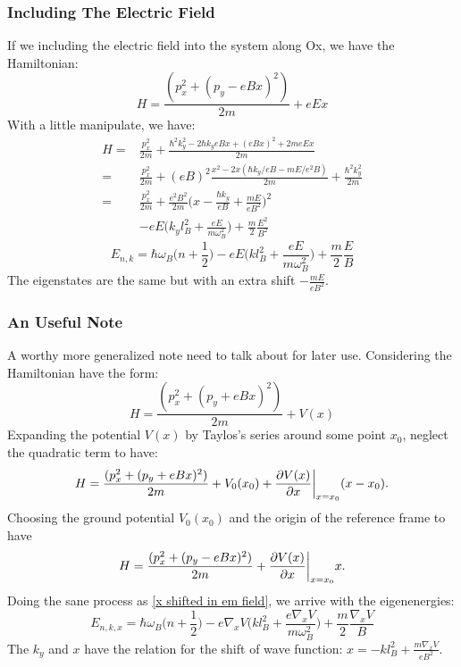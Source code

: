 \documentclass[unnumsec,webpdf,modern,large]{mam-authoring-template}%
\theoremstyle{thmstyleone}%
\theoremstyle{thmstyletwo}%
\theoremstyle{thmstylethree}%
\begin{document}
\begin{appendices}
\subsubsection{Including The Electric Field}
\quad If we including the electric field into the system along Ox, we have the Hamiltonian:
\begin{equation}
	H = \frac{(p_x^2 + (p_y-eBx)^2)}{2m} + eEx
\end{equation}
With a little manipulate, we have:
\begin{align}
	H =& \frac{p_x^2}{2m} + \frac{\hbar^2 k_y^2 - 2\hbar k_y eB x + (eBx)^2 + 2meEx}{2m}\nonumber\\
	=& \frac{p_x^2}{2m} + (eB)^2\frac{x^2 -2x(\hbar k_y /eB - mE/e^2B)}{2m} + \frac{\hbar^2 k_y^2}{2m}\nonumber\\
	\label{x shifted in em field}
	=& \frac{p_x^2}{2m} + \frac{e^2 B^2}{2m}\bigg(x- \frac{\hbar k_y}{eB} + \frac{mE}{eB^2}\bigg)^2\nonumber\\ &-eE\bigg(k_y l_B^2 + \frac{eE}{m \omega^2_B}\bigg) + \frac{m}{2}\frac{E^2}{B^2}
\end{align}
\begin{equation}\label{eigen energies in emf}
	E_{n,k}= \hbar \omega_B \bigg(n+\frac{1}{2}\bigg) - eE\bigg(kl_B^2 + \frac{eE}{m\omega_B^2}\bigg) + \frac{m}{2}\frac{E}{B}
\end{equation}
The eigenstates are the same but with an extra shift \(-\frac{mE}{e B^2}\).
\subsubsection{An Useful Note}
\quad A worthy more generalized note need to talk about for later use. Considering the Hamiltonian have the form:
\begin{equation*}
H = \frac{(p_x^2 + (p_y+eBx)^2)}{2m} + V(x)
\end{equation*}
\quad Expanding the potential \(V(x)\) by Taylos's series around some point \(x_0\), neglect the quadratic term to have:
\begin{equation*}
	H = \frac{(p_x^2 + (p_y+eBx)^2)}{2m} + V_0(x_0) + \pdv{V(x)}{x}\bigg|_{x=x_0} (x-x_0).
\end{equation*}
\quad Choosing the ground potential \(V_0 (x_0)\) and the origin of the reference frame to have
\begin{equation}
		H = \frac{(p_x^2 + (p_y-eBx)^2)}{2m} + \pdv{V(x)}{x}\bigg|_{x=x_0} x.
\end{equation}
\quad Doing the sane process as \eqref{x shifted in em field}, we arrive with the eigenenergies:
\begin{equation}\label{E general with V}
	E_{n,k,x}= \hbar \omega_B \bigg(n+\frac{1}{2}\bigg) - e\nabla_x V\bigg(kl_B^2 + \frac{e\nabla_x V}{m\omega_B^2}\bigg) + \frac{m}{2}\frac{\nabla_x V}{B}
\end{equation}
\quad The \(k_y\) and \(x\) have the relation for the shift of wave function: \(x= -kl_B^2 + \frac{m\nabla_x V}{eB^2}\).

\end{appendices}
\end{document}
